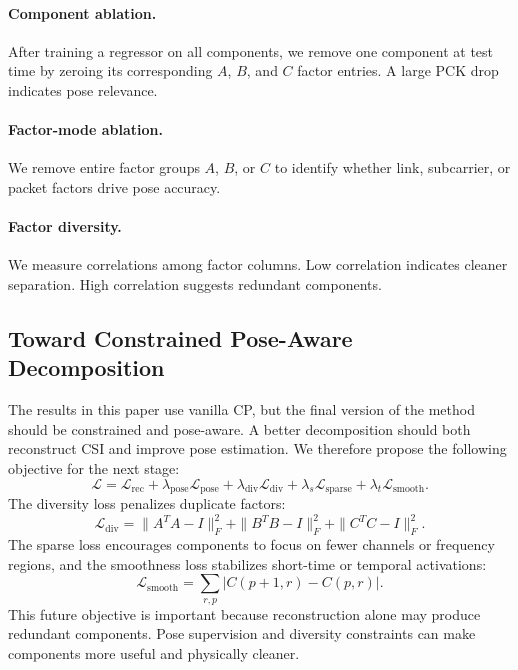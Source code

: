 \documentclass[letterpaper]{article}
\begin{document}
\paragraph{Component ablation.}
After training a regressor on all components, we remove one component at test time by zeroing its corresponding $A$, $B$, and $C$ factor entries. A large PCK drop indicates pose relevance.

\paragraph{Factor-mode ablation.}
We remove entire factor groups $A$, $B$, or $C$ to identify whether link, subcarrier, or packet factors drive pose accuracy.

\paragraph{Factor diversity.}
We measure correlations among factor columns. Low correlation indicates cleaner separation. High correlation suggests redundant components.

\subsection{Toward Constrained Pose-Aware Decomposition}

The results in this paper use vanilla CP, but the final version of the method should be constrained and pose-aware. A better decomposition should both reconstruct CSI and improve pose estimation. We therefore propose the following objective for the next stage:
\begin{equation}
    \mathcal{L}
    =
    \mathcal{L}_{\mathrm{rec}}
    +
    \lambda_{\mathrm{pose}}\mathcal{L}_{\mathrm{pose}}
    +
    \lambda_{\mathrm{div}}\mathcal{L}_{\mathrm{div}}
    +
    \lambda_s\mathcal{L}_{\mathrm{sparse}}
    +
    \lambda_t\mathcal{L}_{\mathrm{smooth}}.
\end{equation}
The diversity loss penalizes duplicate factors:
\begin{equation}
    \mathcal{L}_{\mathrm{div}}
    =
    \|A^TA-I\|_F^2
    +
    \|B^TB-I\|_F^2
    +
    \|C^TC-I\|_F^2.
\end{equation}
The sparse loss encourages components to focus on fewer channels or frequency regions, and the smoothness loss stabilizes short-time or temporal activations:
\begin{equation}
    \mathcal{L}_{\mathrm{smooth}}
    =
    \sum_{r,p}|C(p+1,r)-C(p,r)|.
\end{equation}
This future objective is important because reconstruction alone may produce redundant components. Pose supervision and diversity constraints can make components more useful and physically cleaner.
\end{document}
